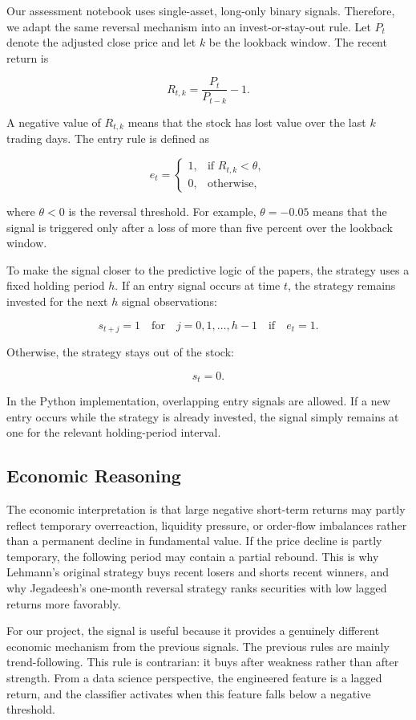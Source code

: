 \documentclass[11pt]{article}
\begin{document}
Our assessment notebook uses single-asset, long-only binary signals. Therefore,
we adapt the same reversal mechanism into an invest-or-stay-out rule. Let
$P_t$ denote the adjusted close price and let $k$ be the lookback window. The
recent return is

\[
R_{t,k} = \frac{P_t}{P_{t-k}} - 1.
\]

A negative value of $R_{t,k}$ means that the stock has lost value over the last
$k$ trading days. The entry rule is defined as

\[
e_t =
\begin{cases}
1, & \text{if } R_{t,k} < \theta, \\
0, & \text{otherwise},
\end{cases}
\]

where $\theta < 0$ is the reversal threshold. For example, $\theta=-0.05$ means
that the signal is triggered only after a loss of more than five percent over the
lookback window.

To make the signal closer to the predictive logic of the papers, the strategy
uses a fixed holding period $h$. If an entry signal occurs at time $t$, the
strategy remains invested for the next $h$ signal observations:

\[
s_{t+j}=1
\quad \text{for} \quad
j = 0,1,\ldots,h-1
\quad \text{if} \quad e_t = 1.
\]

Otherwise, the strategy stays out of the stock:

\[
s_t = 0.
\]

In the Python implementation, overlapping entry signals are allowed. If a new
entry occurs while the strategy is already invested, the signal simply remains
at one for the relevant holding-period interval.

\subsection*{Economic Reasoning}

The economic interpretation is that large negative short-term returns may partly
reflect temporary overreaction, liquidity pressure, or order-flow imbalances
rather than a permanent decline in fundamental value. If the price decline is
partly temporary, the following period may contain a partial rebound. This is why
Lehmann's original strategy buys recent losers and shorts recent winners, and why
Jegadeesh's one-month reversal strategy ranks securities with low lagged returns
more favorably.

For our project, the signal is useful because it provides a genuinely different
economic mechanism from the previous signals. The previous rules are mainly
trend-following. This rule is contrarian: it buys after weakness rather than
after strength. From a data science perspective, the engineered feature is a
lagged return, and the classifier activates when this feature falls below a
negative threshold.
\end{document}
